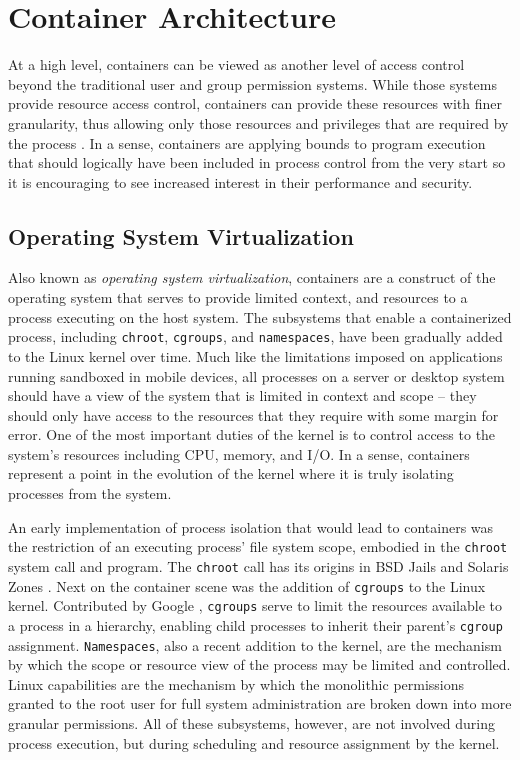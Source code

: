 \section{Container Architecture}
\label{sec:container_arch}
At a high level, containers can be viewed as another level of access control beyond the traditional user and group permission systems. 
While those systems provide resource access control, containers can provide these resources with finer granularity, thus allowing only those resources and privileges that are required by the process \autocite{_felter_1}. 
In a sense, containers are applying bounds to program execution that should logically have been included in process control from the very start so it is encouraging to see increased interest in their performance and security.

\subsection{Operating System Virtualization}
\label{sec:os_vt}
Also known as \emph{operating system virtualization}, containers are a construct of the operating system that serves to provide limited context, and resources to a process executing on the host system. 
The subsystems that enable a containerized process, including \texttt{chroot}, \texttt{cgroups}, and \texttt{namespaces}, have been gradually added to the Linux kernel over time.
Much like the limitations imposed on applications running sandboxed in mobile devices, all processes on a server or desktop system should have a view of the system that is limited in context and scope -- they should only have access to the resources that they require with some margin for error.  
One of the most important duties of the kernel is to control access to the system's resources including CPU, memory, and I/O.  
In a sense, containers represent a point in the evolution of the kernel where it is truly isolating processes from the system. 

An early implementation of process isolation that would lead to containers was the restriction of an executing process' file system scope, embodied in the \texttt{chroot} system call and program. 
The \texttt{chroot} call has its origins in BSD Jails and Solaris Zones \autocite{_zones_1}.
Next on the container scene was the addition of \texttt{cgroups} to the Linux kernel.  Contributed by Google \autocite{googlecgroups}, \texttt{cgroups} serve to limit the resources available to a process in a hierarchy, enabling child processes to inherit their parent's \texttt{cgroup} assignment. 
\texttt{Namespaces}, also a recent addition to the kernel, are the mechanism by which the scope or resource view of the process may be limited and controlled.
Linux capabilities are the mechanism by which the monolithic permissions granted to the root user for full system administration are broken down into more granular permissions.  
All of these subsystems, however, are not involved during process execution, but during scheduling and resource assignment by the kernel.  

